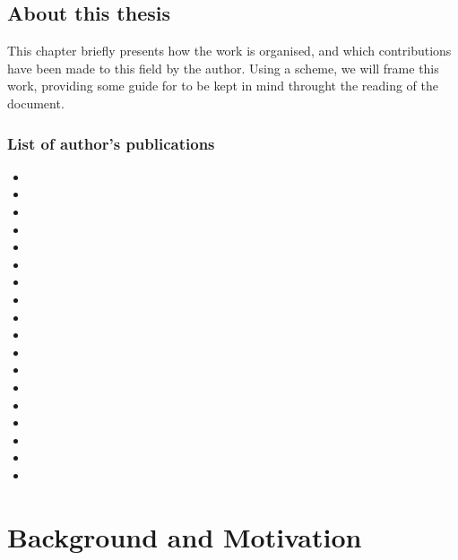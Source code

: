 \documentclass[12pt,a4paper,twoside,openright]{book}
\begin{document}
\mainmatter

\pagestyle{fancy}
\fancyhead[LE,RO]{\bfseries\thepage}

\chapter{About this thesis}

This chapter briefly presents how the work is organised, and which contributions have been made to this field by the author.
%
Using a scheme, we will frame this work, providing some guide for to be kept in mind throught the reading of the document.





\section{List of author's publications}
\nobibliography*
\begin{itemize}
 \item {}
 \item {}
 \item {}
 \item {}
 \item {}
 \item {}
 \item {}
 \item {}
 \item {}
 \item {}
 \item {}
 \item {}
 \item {}
 \item {}
 \item {}
 \item {}
 \item {}
 \item {}
\end{itemize}

\part{Background and Motivation}
\label{background}
\end{document}
